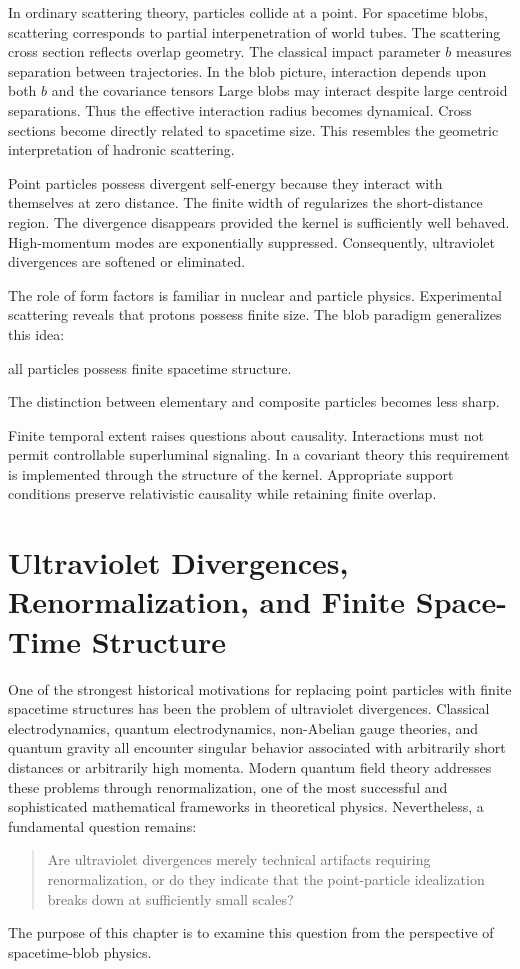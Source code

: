 In ordinary scattering theory, particles collide at a point.
For spacetime blobs, scattering corresponds to partial interpenetration of world tubes.
The scattering cross section reflects overlap geometry.
The classical impact parameter $b$
measures separation between trajectories.
In the blob picture, interaction depends upon both
$b$
and the covariance tensors
Large blobs may interact despite large centroid separations.
Thus the effective interaction radius becomes dynamical.
Cross sections become directly related to spacetime size.
This resembles the geometric interpretation of hadronic scattering.

Point particles possess divergent self-energy because they interact with
themselves at zero distance.
The finite width of
regularizes the short-distance region.
The divergence disappears provided the kernel is sufficiently well behaved.
High-momentum modes are exponentially suppressed.
Consequently, ultraviolet divergences are softened or eliminated.

The role of form factors is familiar in nuclear and particle physics.
Experimental scattering reveals that protons possess finite size.
The blob paradigm generalizes this idea:
\begin{center}
all particles possess finite spacetime structure.
\end{center}
The distinction between elementary and composite particles becomes less sharp.

Finite temporal extent raises questions about causality.
Interactions must not permit controllable superluminal signaling.
In a covariant theory this requirement is implemented through the 
structure of the kernel.
Appropriate support conditions preserve relativistic causality while retaining finite overlap.

\section{Ultraviolet Divergences, Renormalization, 
and Finite Space-Time Structure}
One of the strongest historical motivations for replacing point particles
with finite spacetime structures has been the problem of ultraviolet
divergences.
Classical electrodynamics, quantum electrodynamics, non-Abelian gauge
theories, and quantum gravity all encounter singular behavior associated 
with arbitrarily short distances or arbitrarily high momenta.
Modern quantum field theory addresses these problems through renormalization,
one of the most successful and sophisticated mathematical frameworks in
theoretical physics.
Nevertheless, a fundamental question remains:
\begin{quote}
Are ultraviolet divergences merely technical artifacts requiring
    renormalization, or do they indicate that the point-particle idealization
    breaks down at sufficiently small scales?
\end{quote}
The purpose of this chapter is to examine this question from the 
perspective of spacetime-blob physics.

